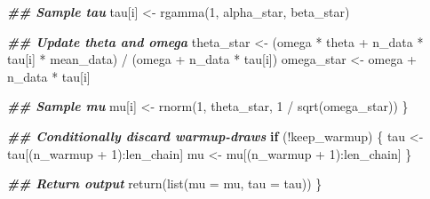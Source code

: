 \documentclass[
  11pt,
]{article}
\newenvironment{Shaded}{\begin{snugshade}}{\end{snugshade}}
\newcommand{\AttributeTok}[1]{\textcolor[rgb]{0.77,0.63,0.00}{#1}}
\newcommand{\ControlFlowTok}[1]{\textcolor[rgb]{0.13,0.29,0.53}{\textbf{#1}}}
\newcommand{\DecValTok}[1]{\textcolor[rgb]{0.00,0.00,0.81}{#1}}
\newcommand{\DocumentationTok}[1]{\textcolor[rgb]{0.56,0.35,0.01}{\textbf{\textit{#1}}}}
\newcommand{\FunctionTok}[1]{\textcolor[rgb]{0.00,0.00,0.00}{#1}}
\newcommand{\NormalTok}[1]{#1}
\newcommand{\OtherTok}[1]{\textcolor[rgb]{0.56,0.35,0.01}{#1}}
\newcommand{\SpecialCharTok}[1]{\textcolor[rgb]{0.00,0.00,0.00}{#1}}
\begin{document}
\begin{Shaded}
\begin{Highlighting}[]
    \DocumentationTok{\#\# Sample tau}
\NormalTok{    tau[i] }\OtherTok{\textless{}{-}} \FunctionTok{rgamma}\NormalTok{(}\DecValTok{1}\NormalTok{, alpha\_star, beta\_star)}
    
    \DocumentationTok{\#\# Update theta and omega}
\NormalTok{    theta\_star }\OtherTok{\textless{}{-}}
\NormalTok{      (omega }\SpecialCharTok{*}\NormalTok{ theta }\SpecialCharTok{+}\NormalTok{ n\_data }\SpecialCharTok{*}\NormalTok{ tau[i] }\SpecialCharTok{*}\NormalTok{ mean\_data) }\SpecialCharTok{/}
\NormalTok{      (omega }\SpecialCharTok{+}\NormalTok{ n\_data }\SpecialCharTok{*}\NormalTok{ tau[i])}
\NormalTok{    omega\_star }\OtherTok{\textless{}{-}}\NormalTok{ omega }\SpecialCharTok{+}\NormalTok{ n\_data }\SpecialCharTok{*}\NormalTok{ tau[i]}
    
    \DocumentationTok{\#\# Sample mu}
\NormalTok{    mu[i] }\OtherTok{\textless{}{-}} \FunctionTok{rnorm}\NormalTok{(}\DecValTok{1}\NormalTok{, theta\_star, }\DecValTok{1} \SpecialCharTok{/} \FunctionTok{sqrt}\NormalTok{(omega\_star))}
\NormalTok{  \}}
  
  \DocumentationTok{\#\# Conditionally discard warmup{-}draws}
  \ControlFlowTok{if}\NormalTok{ (}\SpecialCharTok{!}\NormalTok{keep\_warmup) \{}
\NormalTok{    tau }\OtherTok{\textless{}{-}}\NormalTok{ tau[(n\_warmup }\SpecialCharTok{+} \DecValTok{1}\NormalTok{)}\SpecialCharTok{:}\NormalTok{len\_chain]}
\NormalTok{    mu }\OtherTok{\textless{}{-}}\NormalTok{ mu[(n\_warmup }\SpecialCharTok{+} \DecValTok{1}\NormalTok{)}\SpecialCharTok{:}\NormalTok{len\_chain]}
\NormalTok{  \}}
  
  \DocumentationTok{\#\# Return output}
  \FunctionTok{return}\NormalTok{(}\FunctionTok{list}\NormalTok{(}\AttributeTok{mu =}\NormalTok{ mu,}
              \AttributeTok{tau =}\NormalTok{ tau))}
\NormalTok{\}}
\end{Highlighting}
\end{Shaded}
\end{document}
